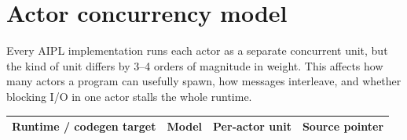 \documentclass[10pt,a4paper,landscape]{article}
\begin{document}
\section*{Actor concurrency model}

Every AIPL implementation runs each actor as a separate
concurrent unit, but the kind of unit differs by 3--4 orders of
magnitude in weight.  This affects how many actors a program can
usefully spawn, how messages interleave, and whether blocking
I/O in one actor stalls the whole runtime.

\begin{longtable}{p{4.0cm} p{4.0cm} p{6.0cm} p{4.0cm}}
  \toprule
  \textbf{Runtime / codegen target} & \textbf{Model} & \textbf{Per-actor unit} & \textbf{Source pointer} \\
  \midrule
  \endhead


\end{longtable}
\end{document}
